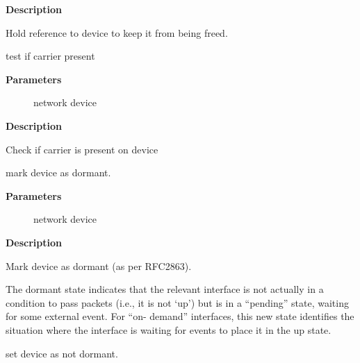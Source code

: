 \documentclass[a4paper,8pt,english]{sphinxmanual}
\begin{document}
\textbf{Description}

Hold reference to device to keep it from being freed.

\begin{fulllineitems}
\label{networking/kapi:c.netif_carrier_ok}
test if carrier present

\end{fulllineitems}


\textbf{Parameters}
\begin{description}
\item[{}] \leavevmode
network device

\end{description}

\textbf{Description}

Check if carrier is present on device

\begin{fulllineitems}
\label{networking/kapi:c.netif_dormant_on}
mark device as dormant.

\end{fulllineitems}


\textbf{Parameters}
\begin{description}
\item[{}] \leavevmode
network device

\end{description}

\textbf{Description}

Mark device as dormant (as per RFC2863).

The dormant state indicates that the relevant interface is not
actually in a condition to pass packets (i.e., it is not `up') but is
in a ``pending'' state, waiting for some external event.  For ``on-
demand'' interfaces, this new state identifies the situation where the
interface is waiting for events to place it in the up state.

\begin{fulllineitems}
\label{networking/kapi:c.netif_dormant_off}
set device as not dormant.

\end{fulllineitems}
\end{document}
